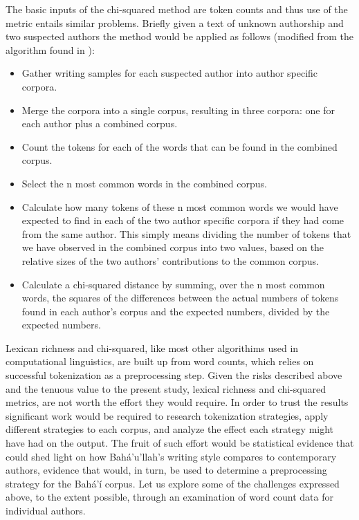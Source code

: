 \documentclass[12pt, oneside]{report}
\begin{document}
\par
The basic inputs of the chi-squared method are token counts and thus use of the metric entails similar problems. Briefly given a text of unknown authorship and two suspected authors the method would be applied as follows (modified from the algorithm found in \cite{laramee_introduction_2018}):
\begin{itemize}
\item Gather writing samples for each suspected author into author specific corpora.
\item Merge the corpora into a single corpus, resulting in three corpora: one for each author plus a combined corpus.
\item Count the tokens for each of the words that can be found in the combined corpus.
\item Select the n most common words in the combined corpus.
\item Calculate how many tokens of these n most common words we would have expected to find in each of the two author specific corpora if they had come from the same author. This simply means dividing the number of tokens that we have observed in the combined corpus into two values, based on the relative sizes of the two authors’ contributions to the common corpus.
\item Calculate a chi-squared distance by summing, over the n most common words, the squares of the differences between the actual numbers of tokens found in each author’s corpus and the expected numbers, divided by the expected numbers.
\end{itemize}
\par
Lexican richness and chi-squared, like most other algorithims used in computational linguistics, are built up from word counts, which relies on successful tokenization as a preprocessing step. Given the risks described above and the tenuous value to the present study, lexical richness and chi-squared metrics, are not worth the effort they would require. In order to trust the results significant work would be required to research tokenization strategies, apply different strategies to each corpus, and analyze the effect each strategy might have had on the output. The fruit of such effort would be statistical evidence that could shed light on how Bah\'{a}'u'llah's writing style compares to contemporary authors, evidence that would, in turn, be used to determine a preprocessing strategy for the Bah\'{a}'\'{i} corpus. Let us explore some of the challenges expressed above, to the extent possible, through an examination of word count data for individual authors.
\end{document}
